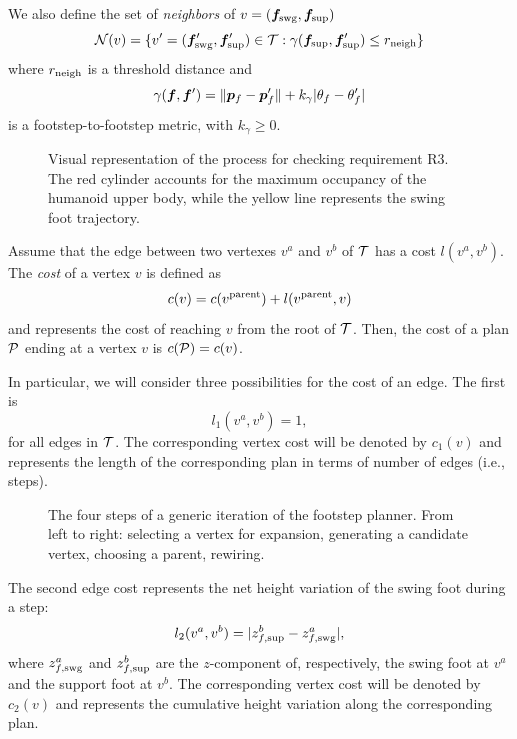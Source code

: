 We also define the set of {\em neighbors} of $v=({\bm{f}}_{\rm swg}, {\bm{f}}_{\rm sup})$
\[
{\cal N}(v) = \{ v'=({\bm{f}}'_{\rm swg}, {\bm{f}}'_{\rm sup}) \in {\cal T} : 
 \gamma({\bm{f}}_{\rm sup}, {\bm{f}}'_{\rm sup}) \le r_{\rm neigh}\}
\]
where $r_{\rm neigh}$ is a threshold distance and
\begin{equation}
\gamma({\bm{f}}, {\bm{f}}') = \lVert {\bm{p}}_f - {\bm{p}}_f' \rVert + k_{\gamma}|\theta_f-\theta_f'|
\label{eq:footstepToFootstepMetric}
\end{equation}
is a footstep-to-footstep metric, with $k_{\gamma}\ge 0$.

\begin{figure}[t]
\ReqCollisionCheck
\caption{Visual representation of the process for checking requirement R3. The red cylinder accounts for the maximum occupancy of the humanoid upper body, while the yellow line represents the swing foot trajectory.}
\label{fig:ReqCollisionCheck}
\end{figure}

Assume that the edge between two vertexes $v^a$ and $v^b$ of $\cal T$ has a cost $l(v^a,v^b)$. 
The {\em cost} of a vertex $v$ is defined as
\[
c(v) = c(v^{\rm parent}) + l(v^{\rm parent}, v)
\]
and represents the cost of reaching $v$ from the root of $\cal T$. 
Then, the cost of a plan $\cal P$ ending at a vertex $v$ is $c({\cal P}) = c(v)$.

In particular, we will consider three possibilities for the cost of an edge. The first is
\begin{equation}
l_1(v^a, v^b) = 1,
\label{eq:costSteps}
\end{equation}
for all edges in $\cal T$. The corresponding vertex cost will be denoted by $c_1(v)$ and represents the length of the corresponding plan in terms of number of edges (i.e., steps). 
    
\begin{figure}[t!]
\FootstepPlanner
\caption{The four steps of a generic iteration of the footstep planner. From left to right: selecting a vertex for expansion, generating a candidate vertex, choosing a parent, rewiring.}
\label{fig:FootstepPlanner}
\end{figure}    
    
The second edge cost represents the net height variation of the swing foot during a step:
\begin{equation}
l_2(v^a, v^b) = |z^b_{f, {\rm sup}} - z^a_{f, {\rm swg}}|,
\label{eq:costHeight}
\end{equation}
where $z^a_{f, {\rm swg}}$ and $z^b_{f, {\rm sup}}$ are the $z$-component of, respectively, the swing foot at $v^a$ and the support foot at $v^b$.  The corresponding vertex cost will be denoted by $c_2(v)$ and represents the cumulative height variation along the corresponding plan. 
    
